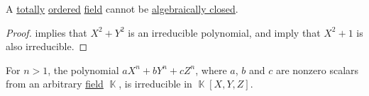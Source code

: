 \begin{corollary}\label{thm:ordered_field_not_algebraically_closed}
  A \hyperref[def:totally_ordered_set]{totally} \hyperref[def:ordered_semiring]{ordered} \hyperref[def:field]{field} cannot be \hyperref[def:algebraically_closed_field]{algebraically closed}.
\end{corollary}
\begin{proof}
   implies that \( X^2 + Y^2 \) is an irreducible polynomial, and  imply that \( X^2 + 1 \) is also irreducible.
\end{proof}

\begin{proposition}\label{thm:axn_byn_czn_irreducible}
  For \( n > 1 \), the polynomial \( a X^n + b Y^n + c Z^n \), where \( a \), \( b \) and \( c \) are nonzero scalars from an arbitrary \hyperref[def:field]{field} \( \BbbK \), is irreducible in \( \BbbK[X, Y, Z] \).
\end{proposition}
